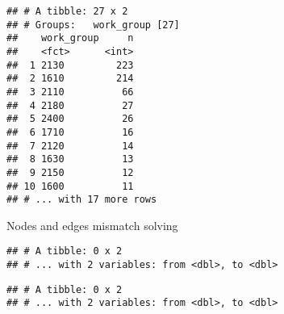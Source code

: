 \documentclass[
]{article}
\newenvironment{Shaded}{\begin{snugshade}}{\end{snugshade}}
\newcommand{\FunctionTok}[1]{\textcolor[rgb]{0.00,0.00,0.00}{#1}}
\newcommand{\NormalTok}[1]{#1}
\newcommand{\OtherTok}[1]{\textcolor[rgb]{0.56,0.35,0.01}{#1}}
\newcommand{\SpecialCharTok}[1]{\textcolor[rgb]{0.00,0.00,0.00}{#1}}
\begin{document}
\begin{verbatim}
## # A tibble: 27 x 2
## # Groups:   work_group [27]
##    work_group     n
##    <fct>      <int>
##  1 2130         223
##  2 1610         214
##  3 2110          66
##  4 2180          27
##  5 2400          26
##  6 1710          16
##  7 2120          14
##  8 1630          13
##  9 2150          12
## 10 1600          11
## # ... with 17 more rows
\end{verbatim}

Nodes and edges mismatch solving

\begin{Shaded}
\end{Shaded}

\begin{verbatim}
## # A tibble: 0 x 2
## # ... with 2 variables: from <dbl>, to <dbl>
\end{verbatim}

\begin{Shaded}
\end{Shaded}

\begin{verbatim}
## # A tibble: 0 x 2
## # ... with 2 variables: from <dbl>, to <dbl>
\end{verbatim}
\end{document}
